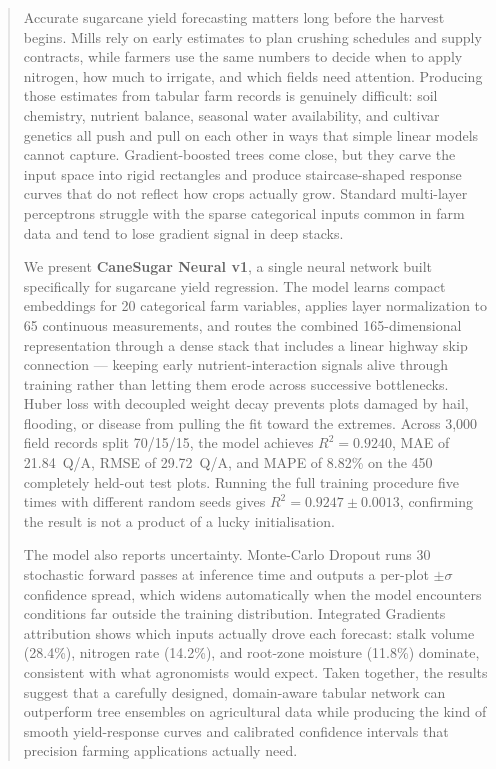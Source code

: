 \documentclass[conference,10pt,letterpaper]{IEEEtran}
\begin{document}
\begin{abstract}
Accurate sugarcane yield forecasting matters long before the harvest begins. Mills rely on early estimates to plan crushing schedules and supply contracts, while farmers use the same numbers to decide when to apply nitrogen, how much to irrigate, and which fields need attention. Producing those estimates from tabular farm records is genuinely difficult: soil chemistry, nutrient balance, seasonal water availability, and cultivar genetics all push and pull on each other in ways that simple linear models cannot capture. Gradient-boosted trees come close, but they carve the input space into rigid rectangles and produce staircase-shaped response curves that do not reflect how crops actually grow. Standard multi-layer perceptrons struggle with the sparse categorical inputs common in farm data and tend to lose gradient signal in deep stacks.

We present \textbf{CaneSugar Neural v1}, a single neural network built specifically for sugarcane yield regression. The model learns compact embeddings for 20 categorical farm variables, applies layer normalization to 65 continuous measurements, and routes the combined 165-dimensional representation through a dense stack that includes a linear highway skip connection --- keeping early nutrient-interaction signals alive through training rather than letting them erode across successive bottlenecks. Huber loss with decoupled weight decay prevents plots damaged by hail, flooding, or disease from pulling the fit toward the extremes. Across 3,000 field records split 70/15/15, the model achieves $R^2 = 0.9240$, MAE of 21.84~Q/A, RMSE of 29.72~Q/A, and MAPE of 8.82\% on the 450 completely held-out test plots. Running the full training procedure five times with different random seeds gives $R^2 = 0.9247 \pm 0.0013$, confirming the result is not a product of a lucky initialisation.

The model also reports uncertainty. Monte-Carlo Dropout runs 30 stochastic forward passes at inference time and outputs a per-plot $\pm\sigma$ confidence spread, which widens automatically when the model encounters conditions far outside the training distribution. Integrated Gradients attribution shows which inputs actually drove each forecast: stalk volume (28.4\%), nitrogen rate (14.2\%), and root-zone moisture (11.8\%) dominate, consistent with what agronomists would expect. Taken together, the results suggest that a carefully designed, domain-aware tabular network can outperform tree ensembles on agricultural data while producing the kind of smooth yield-response curves and calibrated confidence intervals that precision farming applications actually need.
\end{abstract}
\end{document}
